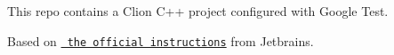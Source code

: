 This repo contains a Clion C++ project configured with Google Test.

Based on \href{https://www.jetbrains.com/help/clion/unit-testing-tutorial.html\#clion-integrations}{\texttt{ the official instructions}} from Jetbrains. 
